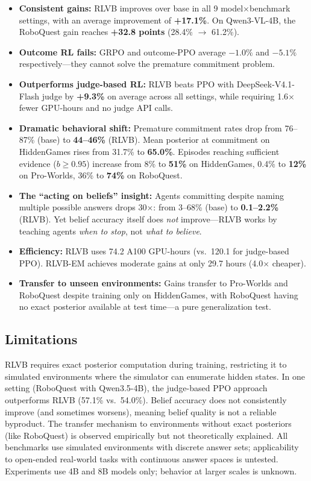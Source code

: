 \documentclass[11pt,a4paper]{article}
\begin{document}
\begin{itemize}
  \item \textbf{Consistent gains:} RLVB improves over base in all 9 model$\times$benchmark settings, with an average improvement of \textbf{+17.1\%}. On Qwen3-VL-4B, the RoboQuest gain reaches \textbf{+32.8 points} (28.4\% $\rightarrow$ 61.2\%).
  \item \textbf{Outcome RL fails:} GRPO and outcome-PPO average $-1.0\%$ and $-5.1\%$ respectively---they cannot solve the premature commitment problem.
  \item \textbf{Outperforms judge-based RL:} RLVB beats PPO with DeepSeek-V4.1-Flash judge by \textbf{+9.3\%} on average across all settings, while requiring 1.6$\times$ fewer GPU-hours and no judge API calls.
  \item \textbf{Dramatic behavioral shift:} Premature commitment rates drop from 76--87\% (base) to \textbf{44--46\%} (RLVB). Mean posterior at commitment on HiddenGames rises from 31.7\% to \textbf{65.0\%}. Episodes reaching sufficient evidence ($b \geq 0.95$) increase from 8\% to \textbf{51\%} on HiddenGames, 0.4\% to \textbf{12\%} on Pro-Worlds, 36\% to \textbf{74\%} on RoboQuest.
  \item \textbf{The ``acting on beliefs'' insight:} Agents committing despite naming multiple possible answers drops 30$\times$: from 3--68\% (base) to \textbf{0.1--2.2\%} (RLVB). Yet belief accuracy itself does \emph{not} improve---RLVB works by teaching agents \emph{when to stop}, not \emph{what to believe}.
  \item \textbf{Efficiency:} RLVB uses 74.2 A100 GPU-hours (vs.\ 120.1 for judge-based PPO). RLVB-EM achieves moderate gains at only 29.7 hours (4.0$\times$ cheaper).
  \item \textbf{Transfer to unseen environments:} Gains transfer to Pro-Worlds and RoboQuest despite training only on HiddenGames, with RoboQuest having no exact posterior available at test time---a pure generalization test.
\end{itemize}

\subsection{Limitations}
RLVB requires exact posterior computation during training, restricting it to simulated environments where the simulator can enumerate hidden states. In one setting (RoboQuest with Qwen3.5-4B), the judge-based PPO approach outperforms RLVB (57.1\% vs.\ 54.0\%). Belief accuracy does not consistently improve (and sometimes worsens), meaning belief quality is not a reliable byproduct. The transfer mechanism to environments without exact posteriors (like RoboQuest) is observed empirically but not theoretically explained. All benchmarks use simulated environments with discrete answer sets; applicability to open-ended real-world tasks with continuous answer spaces is untested. Experiments use 4B and 8B models only; behavior at larger scales is unknown.
\end{document}
